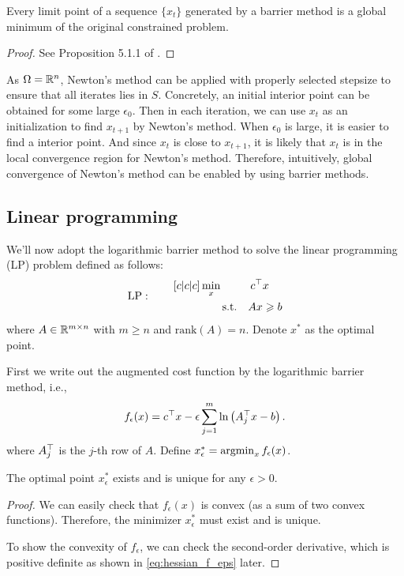 \begin{proposition}
Every limit point of a sequence $\{x_t\}$ generated by a barrier method is a global minimum of the original constrained problem. 
\end{proposition}
\begin{proof}
See Proposition 5.1.1 of \cite{bertsekas2016nonlinear}.
\end{proof}

As $\Omega=\mathbb{R}^n$, Newton's method can be applied with properly selected
stepsize to ensure that all iterates lies in $S$. Concretely, an initial
interior point can be obtained for some large $\epsilon_0$. Then in each
iteration, we can use $x_t$ as an initialization to find $x_{t+1}$ by Newton's
method. When $\epsilon_0$ is large, it is easier to find a interior point. And
since $x_t$ is close to $x_{t+1}$, it is likely that $x_t$ is in the local
convergence region for Newton's method. Therefore, intuitively, global
convergence of Newton's method can be enabled by using barrier methods.

\subsection{Linear programming}

We'll now adopt the logarithmic barrier method to solve the linear programming (LP) problem defined as follows:
\begin{equation}
\label{eq:LP_def}
\text{LP}:\qquad
\begin{aligned}[c|c|c]
&\min_x &c^\trans&x\\
&\qquad\text{s.t.} &Ax&\ge b
\end{aligned}
\end{equation}
where $A\in{\mathbb{R}}^{m\times n}$ with $m\ge n$ and $\mathrm{rank}(A)=n$. Denote $x^*$ as the optimal point. 

First we write out the augmented cost function by the logarithmic barrier method, i.e.,
\begin{equation}
\label{eq:LP_aug_cost}
f_\epsilon(x) = c^\top x-\epsilon \sum_{j=1}^m\ln\left(A^\top_j x-b\right).
\end{equation}
where $A^\top_j$ is the $j$-th row of $A$. Define $x^*_\epsilon=\mathop{\rm argmin}_x f_\epsilon(x)$. 

\begin{fact}
The optimal point $x^*_\epsilon$ exists and is unique for any $\epsilon>0$.
\end{fact}
\begin{proof}
We can easily check that $f_\epsilon(x)$ is convex (as a sum of two convex functions). Therefore, the minimizer $x^*_\epsilon$ must exist and is unique.

To show the convexity of $f_\epsilon$, we can check the second-order derivative,
which is positive definite as shown in \eqref{eq:hessian_f_eps} later.
\end{proof}


